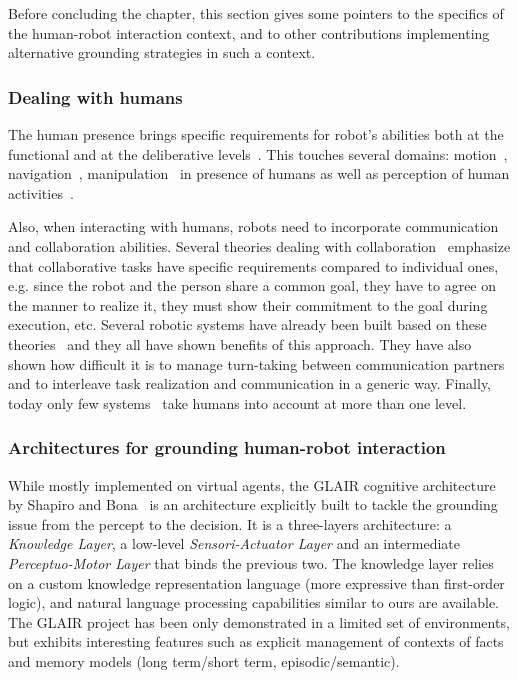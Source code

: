 \documentclass{svmult}
\newcommand{\eg}{e.g.\xspace}
\begin{document}
Before concluding the chapter, this section gives some pointers to the specifics of the human-robot interaction context, 
and to other contributions implementing alternative grounding strategies in such a context.

\subsubsection{Dealing with humans}

The human presence brings specific requirements for robot's abilities both at
the functional and at the deliberative levels~\cite{Klein2004}. This touches
several domains: motion~\cite{Kulic2007,Berg2004},
navigation~\cite{Althaus2004,Sisbot2007}, manipulation~\cite{Kemp2007} in
presence of humans as well as perception of human
activities~\cite{Breazeal2001,Burger2008}.

Also, when interacting with humans, robots need to incorporate communication
and collaboration abilities. Several theories dealing with
collaboration~\cite{Cohen1991,Grosz1996,Clark1996} emphasize that collaborative
tasks have specific requirements compared to individual ones, \eg since the
robot and the person share a common goal, they have to agree on the manner to
realize it, they must show their commitment to the goal during execution, etc.
Several robotic systems have already been built based on these
theories~\cite{Rich1997,Sidner2005,Tambe1997,Breazeal2003} and they all have
shown benefits of this approach. They have also shown how difficult it is to
manage turn-taking between communication partners and to interleave task
realization and communication in a generic way. Finally, today only few
systems~\cite{Fong2006,Breazeal2003,Sisbot2008, Pandey2011} take humans into
account at more than one level.


\subsubsection{Architectures for grounding human-robot interaction}

While mostly implemented on virtual agents, the GLAIR cognitive architecture by
Shapiro and Bona~\cite{Shapiro2009} is an architecture explicitly built to
tackle the grounding issue from the percept to the decision. It is a
three-layers architecture: a \emph{Knowledge Layer}, a low-level
\emph{Sensori-Actuator Layer} and an intermediate \emph{Perceptuo-Motor Layer}
that binds the previous two.  The knowledge layer relies on a custom knowledge
representation language (more expressive than first-order logic), and natural
language processing capabilities similar to ours are available. The GLAIR
project has been only demonstrated in a limited set of environments, but
exhibits interesting features such as explicit management of contexts of facts
and memory models (long term/short term, episodic/semantic).
\end{document}

